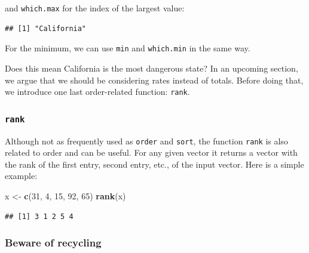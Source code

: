 \documentclass[
]{article}
\newenvironment{Shaded}{\begin{snugshade}}{\end{snugshade}}
\newcommand{\DecValTok}[1]{\textcolor[rgb]{0.00,0.00,0.81}{#1}}
\newcommand{\FunctionTok}[1]{\textcolor[rgb]{0.13,0.29,0.53}{\textbf{#1}}}
\newcommand{\NormalTok}[1]{#1}
\newcommand{\OtherTok}[1]{\textcolor[rgb]{0.56,0.35,0.01}{#1}}
\newcommand{\SpecialCharTok}[1]{\textcolor[rgb]{0.81,0.36,0.00}{\textbf{#1}}}
\begin{document}
and \texttt{which.max} for the index of the largest value:

\begin{Shaded}
\end{Shaded}

\begin{verbatim}
## [1] "California"
\end{verbatim}

For the minimum, we can use \texttt{min} and \texttt{which.min} in the
same way.

Does this mean California is the most dangerous state? In an upcoming
section, we argue that we should be considering rates instead of totals.
Before doing that, we introduce one last order-related function:
\texttt{rank}.

\subsubsection{\texorpdfstring{\texttt{rank}}{rank}}\label{rank}

Although not as frequently used as \texttt{order} and \texttt{sort}, the
function \texttt{rank} is also related to order and can be useful. For
any given vector it returns a vector with the rank of the first entry,
second entry, etc., of the input vector. Here is a simple example:

\begin{Shaded}
\begin{Highlighting}[]
\NormalTok{x }\OtherTok{\textless{}{-}} \FunctionTok{c}\NormalTok{(}\DecValTok{31}\NormalTok{, }\DecValTok{4}\NormalTok{, }\DecValTok{15}\NormalTok{, }\DecValTok{92}\NormalTok{, }\DecValTok{65}\NormalTok{)}
\FunctionTok{rank}\NormalTok{(x)}
\end{Highlighting}
\end{Shaded}

\begin{verbatim}
## [1] 3 1 2 5 4
\end{verbatim}

\subsubsection{Beware of recycling}\label{beware-of-recycling}
\end{document}
